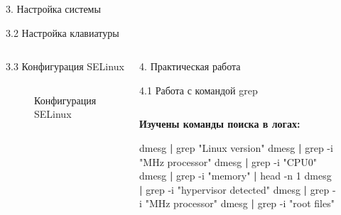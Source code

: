 \documentclass[
  ignorenonframetext,
  aspectratio=169,
  russian,
]{beamer}
\newenvironment{Shaded}{\begin{snugshade}}{\end{snugshade}}
\newcommand{\AttributeTok}[1]{\textcolor[rgb]{0.40,0.45,0.13}{#1}}
\newcommand{\FunctionTok}[1]{\textcolor[rgb]{0.28,0.35,0.67}{#1}}
\newcommand{\KeywordTok}[1]{\textcolor[rgb]{0.00,0.23,0.31}{\textbf{#1}}}
\newcommand{\NormalTok}[1]{\textcolor[rgb]{0.00,0.23,0.31}{#1}}
\newcommand{\StringTok}[1]{\textcolor[rgb]{0.13,0.47,0.30}{#1}}
\begin{document}
\begin{frame}[fragile]{3. Настройка системы}
\begin{block}{3.2 Настройка клавиатуры}
\begin{columns}[c]
\begin{block}{3.3 Конфигурация SELinux}
\begin{columns}[c]
\begin{column}{0.3\linewidth}
\begin{figure}
{}

\caption{\label{fig-selinux}Конфигурация SELinux}

\end{figure}%
\end{column}
\end{columns}
\end{block}

\begin{frame}[fragile]{4. Практическая работа}
\label{ux43fux440ux430ux43aux442ux438ux447ux435ux441ux43aux430ux44f-ux440ux430ux431ux43eux442ux430}
\begin{block}{4.1 Работа с командой grep}
\label{ux440ux430ux431ux43eux442ux430-ux441-ux43aux43eux43cux430ux43dux434ux43eux439-grep}
\begin{columns}[c]
\begin{column}{0.7\linewidth}
\textbf{Изучены команды поиска в логах:}

\begin{Shaded}
\begin{Highlighting}[]
\FunctionTok{dmesg} \KeywordTok{|} \FunctionTok{grep} \StringTok{"Linux version"}
\FunctionTok{dmesg} \KeywordTok{|} \FunctionTok{grep} \AttributeTok{{-}i} \StringTok{"MHz processor"}
\FunctionTok{dmesg} \KeywordTok{|} \FunctionTok{grep} \AttributeTok{{-}i} \StringTok{"CPU0"}
\FunctionTok{dmesg} \KeywordTok{|} \FunctionTok{grep} \AttributeTok{{-}i} \StringTok{"memory"} \KeywordTok{|} \FunctionTok{head} \AttributeTok{{-}n}\NormalTok{ 1}
\FunctionTok{dmesg} \KeywordTok{|} \FunctionTok{grep} \AttributeTok{{-}i} \StringTok{"hypervisor detected"}
\FunctionTok{dmesg} \KeywordTok{|} \FunctionTok{grep} \AttributeTok{{-}i} \StringTok{"MHz processor"}
\FunctionTok{dmesg} \KeywordTok{|} \FunctionTok{grep} \AttributeTok{{-}i} \StringTok{"root files"}
\end{Highlighting}
\end{Shaded}
\end{column}

\begin{column}{0.3\linewidth}
\begin{figure}

\centering{

}
\end{figure}
\end{column}
\end{columns}
\end{block}
\end{frame}
\end{columns}
\end{block}
\end{frame}
\end{document}
